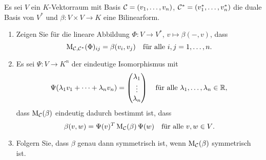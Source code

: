 \documentclass[a4paper, 10pt]{scrartcl}
\begin{document}
\begin{question}
  Es sei $V$ ein $K$-Vektorraum mit Basis $\mathcal{C} = (v_1, \dotsc, v_n)$, $\mathcal{C}^* = (v_1^*, \dotsc, v_n^*)$ die duale Basis von $V^*$ und $\beta \colon V \times V \to K$ eine Bilinearform.
  \begin{enumerate}[leftmargin=*]
    \item
      Zeigen Sie für die lineare Abbildung $\Phi \colon V \to V^*$, $v \mapsto \beta(-,v)$, dass
      \[
        \mathrm{M}_{\mathcal{C}, \mathcal{C}^*}(\Phi)_{ij} = \beta(v_i, v_j)
        \quad
        \text{für alle $i, j = 1, \dotsc, n$}.
      \]
    \item
      Es sei $\Psi \colon V \to K^n$ der eindeutige Isomorphismus mit
      \[
          \Psi(\lambda_1 v_1 + \dotsb + \lambda_n v_n)
        = \begin{pmatrix} \lambda_1 \\ \vdots \\ \lambda_n \end{pmatrix}
        \quad
        \text{für alle $\lambda_1, \dotsc, \lambda_n \in \mathbb{R}$},
      \]
      dass $\mathrm{M}_{\mathcal{C}}(\beta)$ eindeutig dadurch bestimmt ist, dass
      \[
        \beta(v, w) = \Psi(v)^T \, \mathrm{M}_{\mathcal{C}}(\beta) \, \Psi(w)
        \quad
        \text{für alle $v, w \in V$}.
      \]
    \item
      Folgern Sie, dass $\beta$ genau dann symmetrisch ist, wenn $\mathrm{M}_{\mathcal{C}}(\beta)$ symmetrisch ist.
  \end{enumerate}
\end{question}














\newpage


\printsolutions
\end{document}
